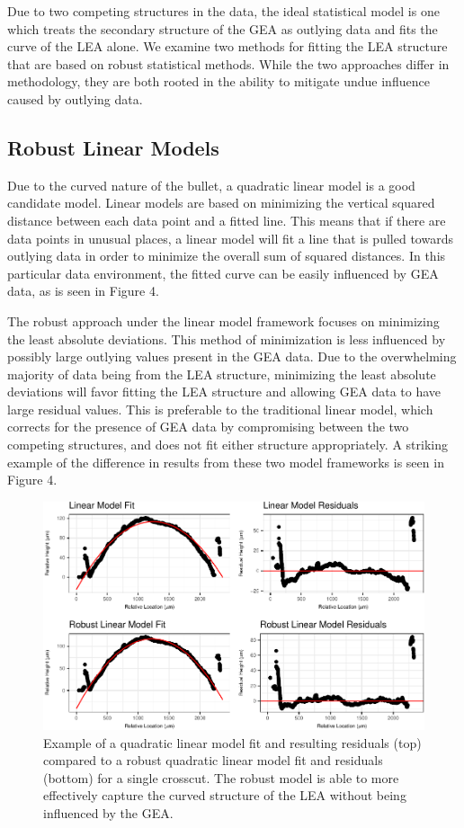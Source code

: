 \documentclass[12pt]{article}
\begin{document}
Due to two competing structures in the data, the ideal statistical model
is one which treats the secondary structure of the GEA as outlying data
and fits the curve of the LEA alone. We examine two methods for fitting
the LEA structure that are based on robust statistical methods. While
the two approaches differ in methodology, they are both rooted in the
ability to mitigate undue influence caused by outlying data.

\subsection{Robust Linear Models}

Due to the curved nature of the bullet, a quadratic linear model is a
good candidate model. Linear models are based on minimizing the vertical
squared distance between each data point and a fitted line. This means
that if there are data points in unusual places, a linear model will fit
a line that is pulled towards outlying data in order to minimize the
overall sum of squared distances. In this particular data environment,
the fitted curve can be easily influenced by GEA data, as is seen in
Figure 4.

The robust approach under the linear model framework focuses on
minimizing the least absolute deviations. This method of minimization is
less influenced by possibly large outlying values present in the GEA
data. Due to the overwhelming majority of data being from the LEA
structure, minimizing the least absolute deviations will favor fitting
the LEA structure and allowing GEA data to have large residual values.
This is preferable to the traditional linear model, which corrects for
the presence of GEA data by compromising between the two competing
structures, and does not fit either structure appropriately. A striking
example of the difference in results from these two model frameworks is
seen in Figure 4.

\begin{figure}
\centering
\includegraphics{writeup_files/figure-latex/unnamed-chunk-3-1.pdf}
\caption{Example of a quadratic linear model fit and resulting residuals
(top) compared to a robust quadratic linear model fit and residuals
(bottom) for a single crosscut. The robust model is able to more
effectively capture the curved structure of the LEA without being
influenced by the GEA.}
\end{figure}
\end{document}
